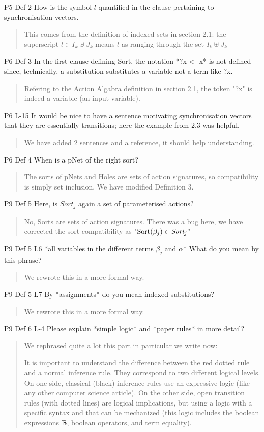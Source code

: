 \documentclass{article}
\begin{document}
P5 Def 2 How is the symbol $l$ quantified in the clause pertaining to synchronisation vectors.
\begin{quote}
This comes from the definition of indexed sets in section 2.1: the superscript $l\in I_k\uplus J_k$ means $l$ as ranging through the set $I_k\uplus J_k$
\end{quote}

P6 Def 3 In the first clause defining Sort, the notation *?x <- x* is not defined since, technically, a substitution substitutes a variable not a term like ?x.
\begin{quote}
Refering to the Action Algabra definition in section 2.1, the token "?x" is indeed a variable (an input variable).
\end{quote}

P6 L-15 It would be nice to have a sentence motivating synchronisation vectors that they are essentially transitions; here the example from 2.3 was helpful.
\begin{quote}
We have added 2 sentences and a reference, it should help understanding. 
\end{quote}

P6 Def 4 When is a pNet of the right sort?
\begin{quote}
The sorts of pNets and Holes are sets of action signatures, so compatibility is simply set inclusion. We have modified Definition 3.
\end{quote}

P9 Def 5 Here, is $Sort_j$ again a set of parameterised actions?
\begin{quote}
No, Sorts are sets of action signatures. There was a bug here, we have corrected the sort compatibility as "$\Sortop(\beta_j)\in\Sort_j$"
\end{quote}

P9 Def 5 L6 *all variables in the different terms $\beta_j$ and $\alpha$* What do you mean by this phrase?
\begin{quote}
We rewrote this in a more formal way.
\end{quote}

P9 Def 5 L7 By *assignments* do you mean indexed substitutions?
\begin{quote}
We rewrote this in a more formal way.
\end{quote}

P9 Def 6 L-4 Please explain *simple logic* and *paper rules* in more detail?

\begin{quote}
We rephrased quite a lot this part in particular we write now:

It is important to understand the difference between the red dotted rule and a normal 
inference rule. They correspond to two different logical levels.
On one side, classical (black) inference rules  use  an expressive logic (like any other computer science article).
 On the other side, open transition rules (with dotted lines) are logical implications, but using a  logic with a specific syntax and that can be mechanized (this logic includes the boolean expressions $\mathbb{B}$, boolean operators, and term equality).
\end{quote}
\end{document}
